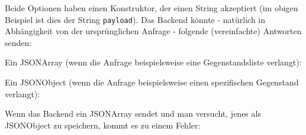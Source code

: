 Beide Optionen haben einen Konstruktor, der einen String akzeptiert (im
obigen Beispiel ist dies der String \texttt{payload}). Das Backend
könnte - natürlich in Abhängigkeit von der ursprünglichen Anfrage -
folgende (vereinfachte) Antworten senden:

Ein JSONArray (wenn die Anfrage beispielsweise eine Gegenstandsliste
verlangt):

\begin{Shaded}
\begin{Highlighting}[]
\OtherTok{[}
  \FunctionTok{\{}
    \FunctionTok{:} \FunctionTok{,}
    \FunctionTok{:} 
  \FunctionTok{\}}\OtherTok{,}
  \FunctionTok{\{}
    \FunctionTok{:} \FunctionTok{,}
    \FunctionTok{:} 
  \FunctionTok{\}}
\OtherTok{]}
\end{Highlighting}
\end{Shaded}

Ein JSONObject (wenn die Anfrage beispielsweise einen spezifischen
Gegenstand verlangt):

\begin{Shaded}
\begin{Highlighting}[]
\FunctionTok{\{}
  \FunctionTok{:} \FunctionTok{,}
  \FunctionTok{:} 
\FunctionTok{\}}
\end{Highlighting}
\end{Shaded}

Wenn das Backend ein JSONArray sendet und man versucht, jenes als
JSONObject zu speichern, kommt es zu einem Fehler:

\begin{Shaded}
\begin{Highlighting}[]
\StringTok{"[}
\NormalTok{                        \{}
                            \NormalTok{: }\NormalTok{,}
                            \NormalTok{: }
\NormalTok{                        \},}
\NormalTok{                        \{}
                            \NormalTok{: }\NormalTok{,}
                            \NormalTok{: }
\NormalTok{                        \}}
\NormalTok{                    ]}

 
\end{Highlighting}
\end{Shaded}

